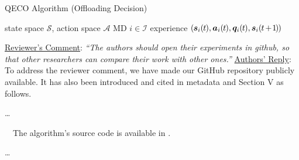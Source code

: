 \documentclass[12pt,draftclsnofoot,onecolumn]{IEEEtran}
\newcommand{\rev}[1]{{\color{blue}#1}} %
\newcommand{\rev}[1]{#1}
\newenvironment{my}[2]%
{\begin{list}{}%
{\setlength{\rightmargin}{#1}\setlength{\leftmargin}{#2}}%


 \item[]{}

} {\end{list}}
\begin{document}
\begin{enumerate}
\begin{my}{0.5cm}{0.5cm}
{\begin{minipage}[b]{0.87\textwidth} 
	\begin{algorithm}[H] \caption{QECO Algorithm (Offloading Decision)}\label{alg:cap2} \centering 
		\begin{algorithmic}[1] \renewcommand{\algorithmicrequire}{\textbf{Input:}} \renewcommand{\algorithmicensure}{\textbf{Output:}}\Require state space $\mathcal{S}$, action space $\mathcal{A}$
			\Ensure MD $i \in \mathcal{I}$ experience  \textcolor{blue}{ $(\hspace{-0.2mm}\boldsymbol{s}_i(\hspace{-0.2mm}t\hspace{-0.2mm}), \boldsymbol{a}_i(\hspace{-0.2mm}t\hspace{-0.2mm}), \boldsymbol{q}_i(\hspace{-0.2mm}t\hspace{-0.2mm}), \boldsymbol{s}_i(\hspace{-0.2mm}t\hspace{-0.3mm}+\hspace{-0.3mm}\hspace{-0.2mm}1\hspace{-0.2mm}\hspace{-0.2mm})\hspace{-0.2mm})$}
		\end{algorithmic} 
	\end{algorithm} 
\end{minipage}}
\end{my}
	

\vspace{10mm}
	\item \underline{Reviewer's Comment}: 
	\textit{``The authors should open their experiments in github, so that other researchers can compare their work with other ones.''} \newline
	\underline{Authors' Reply}: To address the reviewer comment, we have made our GitHub repository  publicly available. It has also been introduced and cited in metadata and Section V as follows.
	
	\begin{my}{1cm}{1cm}
		\rev{
			
			\dots
			
			\,\,\,\,  The algorithm's source code is available in \cite{QECO}.
			
			\dots
	}
	\end{my} \vspace{6mm}





\end{enumerate}
\end{document}

